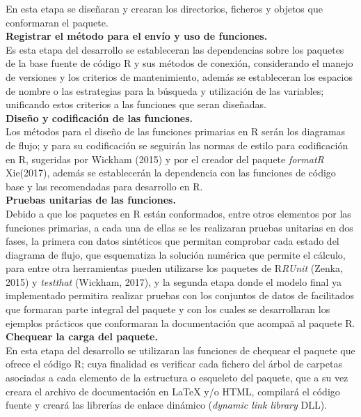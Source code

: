 En esta etapa se dise\~naran y crearan los directorios, ficheros y objetos que conformaran el paquete.\\ 

\noindent
\textbf{Registrar el m\'etodo para el env\'io y uso de funciones.}\\

Es esta etapa del desarrollo se estableceran las dependencias sobre los paquetes de la base fuente de código R y sus métodos de conexión, considerando el manejo de versiones y los criterios de mantenimiento, además  se estableceran  los espacios de nombre o las estrategias para la búsqueda y utilización de las variables; unificando estos criterios a las funciones que seran dise\~nadas.\\

\noindent
\textbf{Dise\~no y codificaci\'on de las funciones.}\\

Los m\'etodos para el dise\~no de las funciones primarias en R ser\'an los diagramas de flujo; y para su codificaci\'on se seguir\'an las normas de estilo para codificaci\'on en R, sugeridas por Wickham (2015) y por el creador del paquete \emph{formatR} Xie(2017), adem\'as se establecer\'an la dependencia con las funciones de c\'odigo base y las recomendadas para desarrollo en R.\\

\noindent
\textbf{Pruebas unitarias de las funciones.}\\

Debido a que los paquetes en R est\'an conformados, entre otros elementos por las funciones primarias, a cada una de ellas se les realizaran pruebas unitarias en dos fases, la primera con datos sint\'eticos que permitan comprobar cada estado del diagrama de flujo, que esquematiza la soluci\'on num\'erica que permite el c\'alculo, para entre otra herramientas pueden utilizarse los paquetes de R\emph{RUnit} (Zenka, 2015) y \emph{testthat} (Wickham, 2017), y la segunda etapa donde el modelo final ya implementado permitira realizar pruebas con los conjuntos de datos de facilitados que formaran parte integral del paquete y con los cuales se desarrollaran los ejemplos pr\'acticos que conformaran la documentaci\'on que acompa\~a al paquete R.\\


\newpage  
\noindent
\textbf{Chequear la carga del paquete.}\\

En esta etapa del desarrollo se utilizaran las funciones de chequear el paquete que ofrece el código R; cuya finalidad es verificar cada fichero del árbol de carpetas asociadas a cada elemento de la estructura o esqueleto del paquete, que a su vez creara el archivo de documentación en LaTeX y/o HTML, compilará el código fuente y creará las librerías de enlace dinámico (\emph{dynamic link library} DLL).\\  

